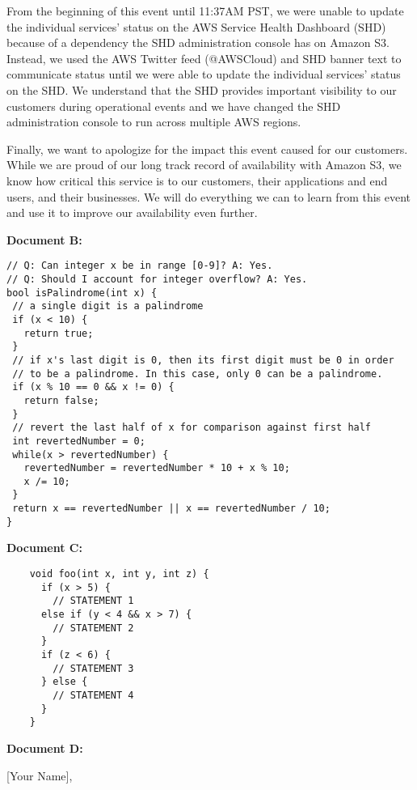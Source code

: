 \documentclass{report}
\begin{document}
\begin{spacing}{1.4}
\begin{enumerate}[leftmargin=*]
      From the beginning of this event until 11:37AM PST, we were unable to update the individual services’ status on the AWS Service Health Dashboard (SHD) because of a dependency the SHD administration console has on Amazon S3. Instead, we used the AWS Twitter feed (@AWSCloud) and SHD banner text to communicate status until we were able to update the individual services’ status on the SHD.  We understand that the SHD provides important visibility to our customers during operational events and we have changed the SHD administration console to run across multiple AWS regions.

      Finally, we want to apologize for the impact this event caused for our customers. While we are proud of our long track record of availability with Amazon S3, we know how critical this service is to our customers, their applications and end users, and their businesses. We will do everything we can to learn from this event and use it to improve our availability even further.~
    
    
    \newpage

    \textbf{Document B:}

    \begin{lstlisting}
// Q: Can integer x be in range [0-9]? A: Yes.
// Q: Should I account for integer overflow? A: Yes.
bool isPalindrome(int x) {
 // a single digit is a palindrome
 if (x < 10) {
   return true;
 }
 // if x's last digit is 0, then its first digit must be 0 in order
 // to be a palindrome. In this case, only 0 can be a palindrome.
 if (x % 10 == 0 && x != 0) {
   return false;
 }
 // revert the last half of x for comparison against first half
 int revertedNumber = 0;
 while(x > revertedNumber) {
   revertedNumber = revertedNumber * 10 + x % 10;
   x /= 10;
 }
 return x == revertedNumber || x == revertedNumber / 10;
}
\end{lstlisting}

    \textbf{Document C:}
    \begin{lstlisting}
    void foo(int x, int y, int z) {
      if (x > 5) {
        // STATEMENT 1
      else if (y < 4 && x > 7) {
        // STATEMENT 2
      }
      if (z < 6) {
        // STATEMENT 3
      } else {
        // STATEMENT 4
      }
    }
  \end{lstlisting}

    \newpage
    \textbf{Document D:}

    [Your Name],


\end{enumerate}
\end{spacing}
\end{document}
